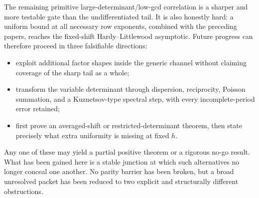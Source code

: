 The remaining primitive large-determinant/low-gcd correlation is a
sharper and more testable gate than the undifferentiated tail.  It is
also honestly hard: a uniform bound at all necessary row exponents,
combined with the preceding papers, reaches the fixed-shift
Hardy--Littlewood asymptotic.  Future progress can therefore proceed in
three falsifiable directions:
\begin{itemize}
\item exploit additional factor shapes inside the generic channel
without claiming coverage of the sharp tail as a whole;
\item transform the variable determinant through dispersion,
reciprocity, Poisson summation, and a Kuznetsov-type spectral step, with
every incomplete-period error retained;
\item first prove an averaged-shift or restricted-determinant theorem,
then state precisely what extra uniformity is missing at fixed $h$.
\end{itemize}

Any one of these may yield a partial positive theorem or a rigorous
no-go result.  What has been gained here is a stable junction at which
such alternatives no longer conceal one another.  No parity barrier has
been broken, but a broad unresolved packet has been reduced to two
explicit and structurally different obstructions.
